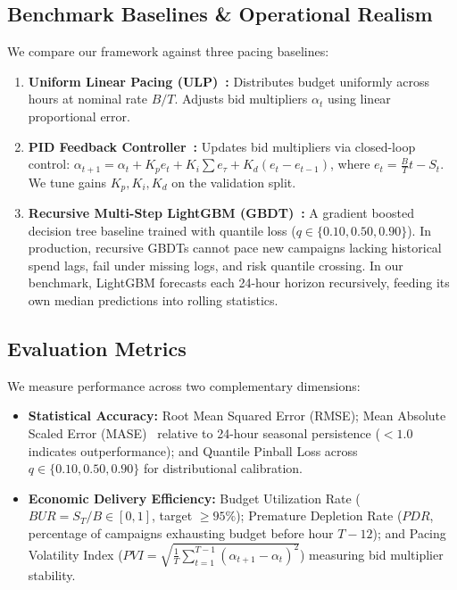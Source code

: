\documentclass[sigconf]{acmart}
\begin{document}
\subsection{Benchmark Baselines \& Operational Realism}
We compare our framework against three pacing baselines:
\begin{enumerate}
  \item \textbf{Uniform Linear Pacing (ULP)~\cite{xu2015smart}:} Distributes budget uniformly across hours at nominal rate $B/T$. Adjusts bid multipliers $\alpha_t$ using linear proportional error.
  \item \textbf{PID Feedback Controller~\cite{lee2013real}:} Updates bid multipliers via closed-loop control: $\alpha_{t+1} = \alpha_t + K_p e_t + K_i \sum e_\tau + K_d (e_t - e_{t-1})$, where $e_t = \frac{B}{T} t - S_t$. We tune gains $K_p, K_i, K_d$ on the validation split.
  \item \textbf{Recursive Multi-Step LightGBM (GBDT)~\cite{ke2017lightgbm}:} A gradient boosted decision tree baseline trained with quantile loss ($q \in \{0.10, 0.50, 0.90\}$). In production, recursive GBDTs cannot pace new campaigns lacking historical spend lags, fail under missing logs, and risk quantile crossing. In our benchmark, LightGBM forecasts each 24-hour horizon recursively, feeding its own median predictions into rolling statistics.
\end{enumerate}

\subsection{Evaluation Metrics}
We measure performance across two complementary dimensions:
\begin{itemize}
  \item \textbf{Statistical Accuracy:} Root Mean Squared Error (RMSE); Mean Absolute Scaled Error (MASE)~\cite{hyndman2006another} relative to 24-hour seasonal persistence ($< 1.0$ indicates outperformance); and Quantile Pinball Loss across $q \in \{0.10, 0.50, 0.90\}$ for distributional calibration.
  \item \textbf{Economic Delivery Efficiency:} Budget Utilization Rate ($BUR = S_T / B \in [0, 1]$, target $\ge 95\%$); Premature Depletion Rate ($PDR$, percentage of campaigns exhausting budget before hour $T-12$); and Pacing Volatility Index ($PVI = \sqrt{\frac{1}{T}\sum_{t=1}^{T-1} (\alpha_{t+1} - \alpha_t)^2}$) measuring bid multiplier stability.
\end{itemize}
\end{document}
